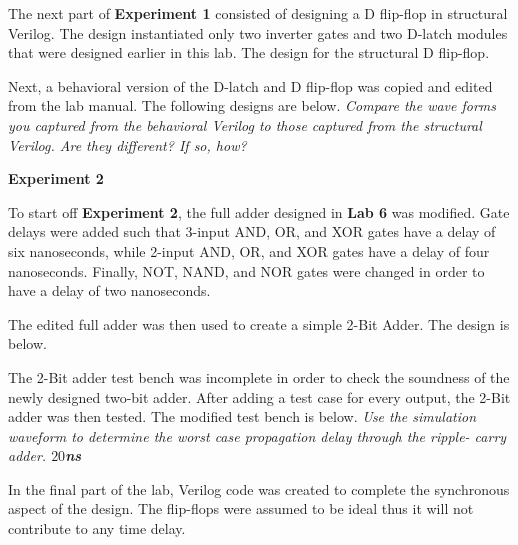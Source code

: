 \documentclass[a4paper,12pt]{article}
\begin{document}
  
  
  The next part of \textbf{Experiment 1} consisted of designing a D flip-flop in
  structural Verilog. The design instantiated only two inverter gates and two D-latch
  modules that were designed earlier in this lab. The design for the structural D
  flip-flop.

  
  
  Next, a behavioral version of the D-latch and D flip-flop was copied and edited from
  the lab manual. The following designs are below. \textit{Compare the wave forms you captured from the behavioral Verilog to those captured from the
structural Verilog. Are they different? If so, how?}

  

  

  \textbf{Experiment 2}
  
  To start off \textbf{Experiment 2}, the full adder designed in \textbf{Lab 6} was
  modified. Gate delays were added such that 3-input AND, OR, and XOR gates have a 
  delay of six nanoseconds, while 2-input AND, OR, and XOR gates have a delay
  of four nanoseconds. Finally, NOT, NAND, and NOR gates were changed in order to 
  have a delay of two nanoseconds.

  
  
  The edited full adder was then used to create a simple 2-Bit Adder. The design
  is below.

  
  
  The 2-Bit adder test bench was incomplete in order to check the soundness of the
  newly designed two-bit adder. After adding a test case for every output, the 2-Bit
  adder was then tested. The modified test bench is below. \textit{Use the simulation waveform to determine the worst case propagation delay through the ripple-
carry adder. \textbf{$20$ns}}

  
  
  In the final part of the lab, Verilog code was created to complete the synchronous
  aspect of the design. The flip-flops were assumed to be ideal thus it will not contribute
  to any time delay.
\end{document}
